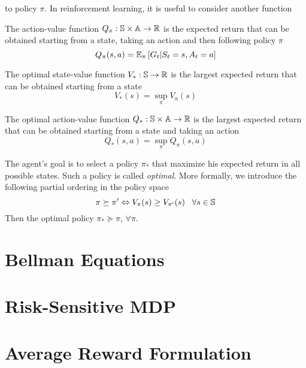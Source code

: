 to policy $\pi$. In reinforcement learning, it is useful to consider another
function 
\begin{definition}
	The action-value function $Q_\pi: \S \times \A \to \R$ is the expected 
	return that can be obtained starting from a state, taking an action and
	then following policy $\pi$
	\begin{equation}
		Q_\pi(s,a) = \E[\pi]{G_t|S_t = s, A_t = a}
	\end{equation}
\end{definition}
\begin{definition}
	The optimal state-value function $V_*: \S \to \R$ is the largest expected 
	return that can be obtained starting from a state
	\begin{equation}
		V_*(s) = \sup_\pi V_\pi(s)
	\end{equation}
\end{definition}
\begin{definition}
	The optimal action-value function $Q_*: \S \times \A \to \R$ is the largest
	expected return that can be obtained starting from a state and taking an
	action
	\begin{equation}
		Q_*(s,a) = \sup_\pi Q_\pi(s,a)
	\end{equation}
\end{definition}
The agent's goal is to select a policy $\pi_*$ that maximize his expected return
in all possible states. Such a policy is called \emph{optimal}. More formally,
we introduce the following partial ordering in the policy space
\begin{equation}
	\pi \succeq \pi' \Leftrightarrow V_\pi(s) \geq V_{\pi'}(s) \;\;\; \forall s \in \S
\end{equation}
Then the optimal policy $\pi_* \succeq \pi$, $\forall \pi$.

\section{Bellman Equations}



\section{Risk-Sensitive MDP}



\section{Average Reward Formulation}




